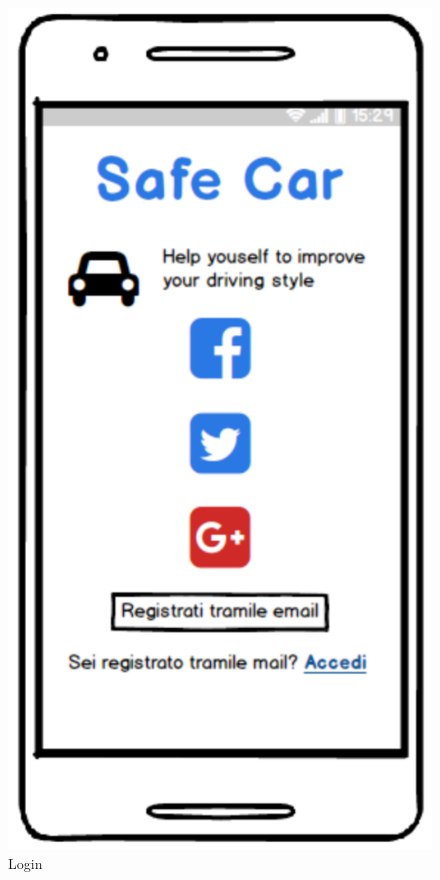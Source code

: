 \begin{figure}[!htbp]
\begin{minipage}[b]{0.35\textwidth}
  \end{minipage}
  \hfill
  \begin{minipage}[b]{0.35\textwidth}
    \includegraphics[width=\textwidth]{cpt/img/Login.png}
    \caption{Login}
  \end{minipage}
\end{figure}

